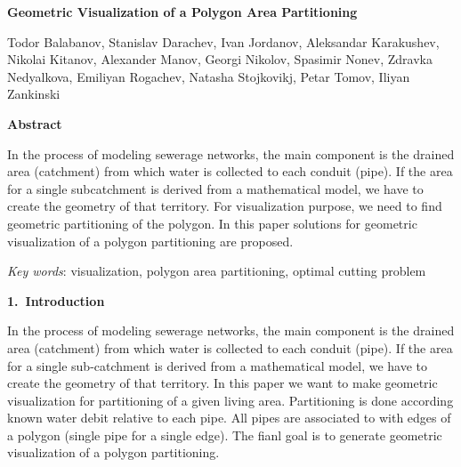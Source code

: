 \documentclass[11pt,leqno]{book}
\newcommand{\sect}[1]{\vskip7mm\par{\large \bf #1}}
\begin{document}
\begin{center}
\textbf{\LARGE Geometric Visualization of a Polygon Area Partitioning}

\vspace*{5mm}

Todor Balabanov,
Stanislav Darachev,
Ivan Jordanov,
Aleksandar Karakushev,
Nikolai Kitanov,
Alexander Manov,
Georgi Nikolov,
Spasimir Nonev,
Zdravka Nedyalkova,
Emiliyan Rogachev,
Natasha Stojkovikj,
Petar Tomov,
Iliyan Zankinski

\end{center}

\date{18-22 Sep 2017}

\sect{Abstract}

In the process of modeling sewerage networks, the main component is the drained area (catchment) from which water is collected to each conduit (pipe). If the area for a single subcatchment is derived from a mathematical model, we have to create the geometry of that territory. For visualization purpose, we need to find geometric partitioning of the polygon. In this paper solutions for geometric visualization of a polygon partitioning are proposed.

\textit{Key words}: visualization, polygon area partitioning, optimal cutting problem

\sect{1.~Introduction}

In the process of modeling sewerage networks, the main component is the drained area (catchment) from which water is collected to each conduit (pipe). If the area for a single sub-catchment is derived from a mathematical model, we have to create the geometry of that territory. In this paper we want to make geometric visualization for partitioning of a given living area. Partitioning is done according known water debit relative to each pipe. All pipes are associated to with edges of a polygon (single pipe for a single edge). The fianl goal is to generate geometric visualization of a polygon partitioning.  
\end{document}
